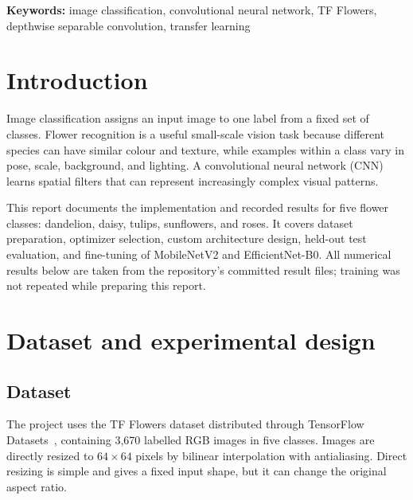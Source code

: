 \documentclass[11pt,a4paper]{article}
\begin{document}
\begin{abstract}
This project studies five-class flower recognition on the TF Flowers dataset.
The work prepares a reproducible stratified data split, compares optimizers
using a compact depthwise separable convolutional neural network, evaluates a
standard CNN against a parameter-efficient CNN, and fine-tunes two
ImageNet-pretrained mobile architectures~\cite{mobilenet,efficientnet}. The saved experiment records show
that the standard custom CNN achieved 79.82\% test accuracy, while the compact
custom model achieved 76.18\%. MobileNetV2 reached the highest recorded test
accuracy (85.09\%), at substantially higher model size and computational cost
than the compact model. These results illustrate the accuracy--efficiency
trade-off between training a small model from scratch and adapting pretrained
visual features.
\end{abstract}

\textbf{Keywords:} image classification, convolutional neural network,
TF Flowers, depthwise separable convolution, transfer learning

\section{Introduction}
Image classification assigns an input image to one label from a fixed set of
classes. Flower recognition is a useful small-scale vision task because
different species can have similar colour and texture, while examples within a
class vary in pose, scale, background, and lighting. A convolutional neural
network (CNN) learns spatial filters that can represent increasingly complex
visual patterns.

This report documents the implementation and recorded results for five flower
classes: dandelion, daisy, tulips, sunflowers, and roses. It covers dataset
preparation, optimizer selection, custom architecture design, held-out test
evaluation, and fine-tuning of MobileNetV2 and EfficientNet-B0. All numerical
results below are taken from the repository's committed result files; training
was not repeated while preparing this report.

\section{Dataset and experimental design}
\subsection{Dataset}
The project uses the TF Flowers dataset distributed through TensorFlow
Datasets~\cite{tfdsflowers}, containing 3,670 labelled RGB images in five classes. Images are
directly resized to $64\times64$ pixels by bilinear interpolation with
antialiasing. Direct resizing is simple and gives a fixed input shape, but it
can change the original aspect ratio.
\end{document}
